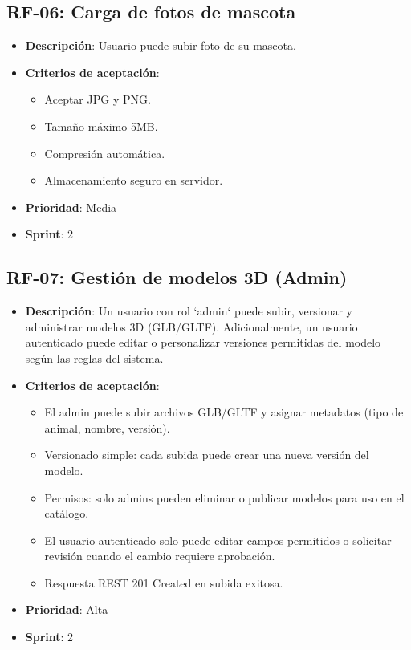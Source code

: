 \documentclass[12pt,a4paper]{article}
\begin{document}
\subsection{RF-06: Carga de fotos de mascota}
\begin{itemize}[leftmargin=*]
    \item \textbf{Descripci\'on}: Usuario puede subir foto de su mascota.
    \item \textbf{Criterios de aceptaci\'on}:
    \begin{itemize}[leftmargin=*]
        \item Aceptar JPG y PNG.
        \item Tama\~no m\'aximo 5MB.
        \item Compresi\'on autom\'atica.
        \item Almacenamiento seguro en servidor.
    \end{itemize}
    \item \textbf{Prioridad}: Media
    \item \textbf{Sprint}: 2
\end{itemize}

\subsection{RF-07: Gestión de modelos 3D (Admin)}
\begin{itemize}[leftmargin=*]
    \item \textbf{Descripci\'on}: Un usuario con rol `admin` puede subir, versionar y administrar modelos 3D (GLB/GLTF). Adicionalmente, un usuario autenticado puede editar o personalizar versiones permitidas del modelo seg\'un las reglas del sistema.
    \item \textbf{Criterios de aceptaci\'on}:
    \begin{itemize}[leftmargin=*]
        \item El admin puede subir archivos GLB/GLTF y asignar metadatos (tipo de animal, nombre, versión).
        \item Versionado simple: cada subida puede crear una nueva versión del modelo.
        \item Permisos: solo admins pueden eliminar o publicar modelos para uso en el catálogo.
        \item El usuario autenticado solo puede editar campos permitidos o solicitar revisión cuando el cambio requiere aprobación.
        \item Respuesta REST 201 Created en subida exitosa.
    \end{itemize}
    \item \textbf{Prioridad}: Alta
    \item \textbf{Sprint}: 2
\end{itemize}
\end{document}
